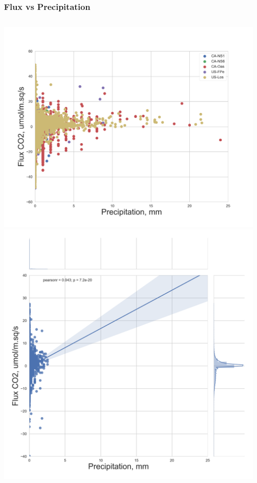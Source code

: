 \documentclass{beamer}
\begin{document}
\begin{frame}
\frametitle{Flux vs Precipitation}

\begin{columns}[t]
\centering
\includegraphics[width=\textwidth]{FvsP/all.png}\\
\includegraphics[width=\textwidth]{FvsP/CA-NS1.png}
\centering

\end{columns}
\end{frame}
\end{document}
